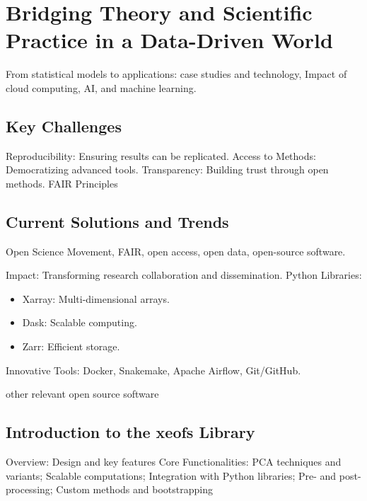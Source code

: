 \chapter{Bridging Theory and Scientific Practice in a Data-Driven World}

\ifpdf
    \graphicspath{{content/chapter3/figs/raster/}{content/chapter3/figs/pdf/}{content/chapter3/figs/}}
\else
    \graphicspath{{content/chapter3/figs/vector/}{content/chapter3/figs/}}
\fi

From statistical models to applications: case studies and technology, Impact of cloud computing, AI, and machine learning.
\section{Key Challenges}
Reproducibility: Ensuring results can be replicated.
Access to Methods: Democratizing advanced tools.
Transparency: Building trust through open methods.
FAIR Principles
\section{Current Solutions and Trends}
Open Science Movement, FAIR, open access, open data, open-source software.

Impact: Transforming research collaboration and dissemination.
Python Libraries:
\begin{itemize}
    \item Xarray: Multi-dimensional arrays.
    \item Dask: Scalable computing.
    \item Zarr: Efficient storage.
\end{itemize}
Innovative Tools: Docker, Snakemake, Apache Airflow, Git/GitHub.

other relevant open source software

\section{Introduction to the xeofs Library}
Overview: Design and key features
Core Functionalities: PCA techniques and variants;
Scalable computations; Integration with Python libraries;
Pre- and post-processing; Custom methods and bootstrapping

